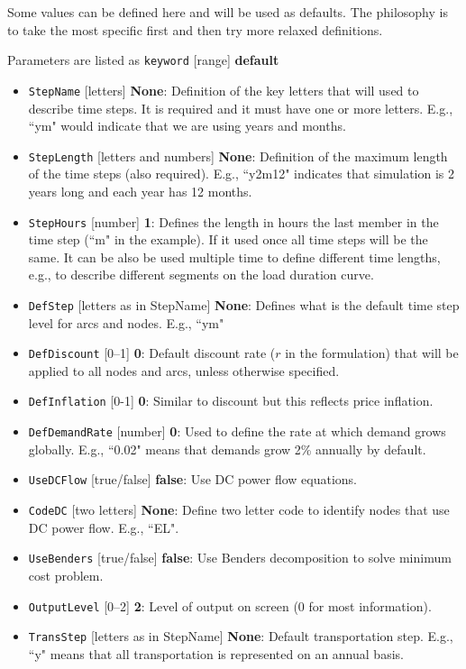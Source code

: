 \documentclass{article}
\begin{document}
Some values can be defined here and will be used as defaults. The philosophy is to take the most specific first and then try more relaxed definitions.

Parameters are listed as \verb=keyword= [range] \textbf{default}
\begin{itemize}
  \item \verb=StepName= [letters] \textbf{None}: Definition of the key letters that will used to describe time steps. It is required and it must have one or more letters. E.g., ``ym" would indicate that we are using years and months.
  \item \verb=StepLength= [letters and numbers] \textbf{None}: Definition of the maximum length of the time steps (also required). E.g., ``y2m12" indicates that simulation is 2 years long and each year has 12 months.
  \item \verb=StepHours= [number] \textbf{1}: Defines the length in hours the last member in the time step (``m" in the example). If it used once all time steps will be the same. It can be also be used multiple time to define different time lengths, e.g., to describe different segments on the load duration curve.
  \item \verb=DefStep= [letters as in StepName] \textbf{None}: Defines what is the default time step level for arcs and nodes. E.g., ``ym"
  \item \verb=DefDiscount= [0--1] \textbf{0}: Default discount rate ($r$ in the formulation) that will be applied to all nodes and arcs, unless otherwise specified.
  \item \verb=DefInflation= [0-1] \textbf{0}: Similar to discount but this reflects price inflation.
  \item \verb=DefDemandRate= [number] \textbf{0}: Used to define the rate at which demand grows globally. E.g., ``0.02" means that demands grow 2\% annually by default.
  \item \verb=UseDCFlow= [true/false] \textbf{false}: Use DC power flow equations.
  \item \verb=CodeDC= [two letters] \textbf{None}: Define two letter code to identify nodes that use DC power flow. E.g., ``EL".
  \item \verb=UseBenders= [true/false] \textbf{false}: Use Benders decomposition to solve minimum cost problem.
  \item \verb=OutputLevel= [0--2] \textbf{2}: Level of output on screen (0 for most information).
  \item \verb=TransStep= [letters as in StepName] \textbf{None}: Default transportation step. E.g., ``y" means that all transportation is represented on an annual basis.

\end{itemize}
\end{document}
